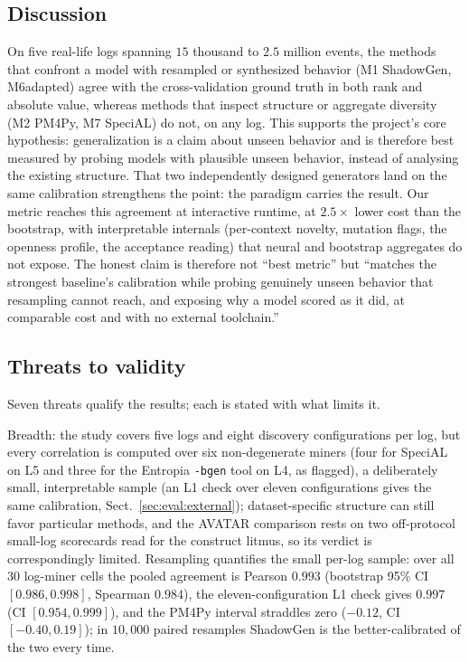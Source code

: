 \documentclass[runningheads]{llncs}
\newcommand{\chg}[1]{#1}
\begin{document}
\subsection{Discussion}
\label{sec:eval:discussion}
On five real-life logs spanning $15$ thousand to $2.5$ million events, the methods that confront a model with resampled or synthesized behavior (M1 ShadowGen, M6adapted) agree with the cross-validation ground truth in both rank and absolute value, whereas methods that inspect structure or aggregate diversity (M2 PM4Py, M7 SpeciAL) do not, on any log. This supports the project's core hypothesis: generalization is a claim about unseen behavior and is therefore best measured by probing models with plausible unseen behavior, instead of analysing the existing structure. That two independently designed generators land on the same calibration strengthens the point: the paradigm carries the result. Our metric reaches this agreement at interactive runtime, at $2.5\times$ lower cost than the bootstrap, with interpretable internals (per-context novelty, mutation flags, the openness profile, the acceptance reading) that neural and bootstrap aggregates do not expose. The honest claim is therefore not ``best metric'' but ``matches the strongest baseline's calibration while probing genuinely unseen behavior that resampling cannot reach, and exposing why a model scored as it did, at comparable cost and with no external toolchain.''

\subsection{Threats to validity}
\label{sec:eval:threats}
Seven threats qualify the results; each is stated with what limits it.

\chg{Breadth: the study covers five logs and eight discovery configurations per log, but every correlation is computed over six non-degenerate miners (four for SpeciAL on L5 and three for the Entropia \texttt{-bgen} tool on L4, as flagged), a deliberately small, interpretable sample (an L1 check over eleven configurations gives the same calibration, Sect.~\ref{sec:eval:external}); dataset-specific structure can still favor particular methods, and the AVATAR comparison rests on two off-protocol small-log scorecards read for the construct litmus, so its verdict is correspondingly limited.} \chg{Resampling quantifies the small per-log sample: over all $30$ log-miner cells the pooled agreement is Pearson $0.993$ (bootstrap 95\% CI $[0.986,0.998]$, Spearman $0.984$), the eleven-configuration L1 check gives $0.997$ (CI $[0.954,0.999]$), and the PM4Py interval straddles zero ($-0.12$, CI $[-0.40,0.19]$); in $10{,}000$ paired resamples ShadowGen is the better-calibrated of the two every time.}
\end{document}

